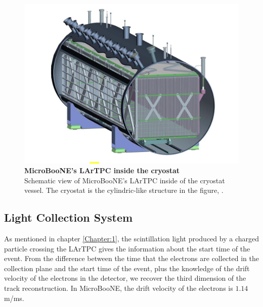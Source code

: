 \begin{figure}[h!]
    \begin{center}
        \includegraphics[scale=0.35]{Figures/uboone_cryo.png}
        \caption[MicroBooNE's LArTPC inside the cryostat]{{\textbf{MicroBooNE's LArTPC inside the cryostat}} \\ Schematic view of MicroBooNE's LArTPC inside of the cryostat vessel. The cryostat is the cylindric-like structure in the figure, \cite{microboone_design}.}
        \label{uboone_cryo} 
    \end{center}
\end{figure}

\subsection{Light Collection System}

As mentioned in chapter \ref{Chapter:1}, the scintillation light produced by a charged particle crossing the LArTPC gives the information about the start time of the event. From the difference between the time that the electrons are collected in the collection plane and the start time of the event, plus the knowledge of the drift velocity of the electrons in the detector, we recover the third dimension of the track reconstruction. In MicroBooNE, the drift velocity of the electrons is $1.14$ m/ms. 

